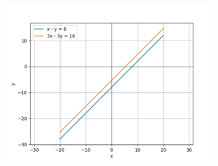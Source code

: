 \documentclass[journal,12pt,onecolumn]{IEEEtran}
\theoremstyle{remark}
\begin{document}
\begin{figure}[H]
    \centering
    \includegraphics[width=\columnwidth]{figs/fig.png}
 \end{figure}
\end{document}
